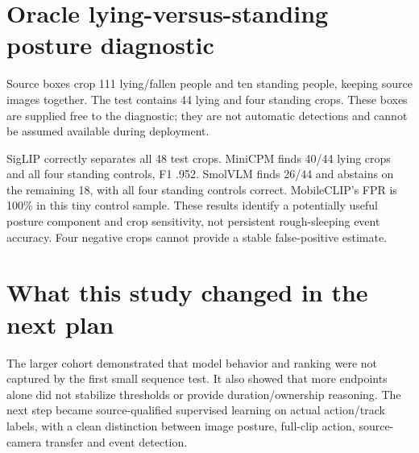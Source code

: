 \section{Oracle lying-versus-standing posture diagnostic}
Source boxes crop 111 lying/fallen people and ten standing people, keeping source images together. The test contains 44 lying and four standing crops. These boxes are supplied free to the diagnostic; they are not automatic detections and cannot be assumed available during deployment.

SigLIP correctly separates all 48 test crops. MiniCPM finds 40/44 lying crops and all four standing controls, F1 .952. SmolVLM finds 26/44 and abstains on the remaining 18, with all four standing controls correct. MobileCLIP's FPR is 100\% in this tiny control sample. These results identify a potentially useful posture component and crop sensitivity, not persistent rough-sleeping event accuracy. Four negative crops cannot provide a stable false-positive estimate.

\section{What this study changed in the next plan}
The larger cohort demonstrated that model behavior and ranking were not captured by the first small sequence test. It also showed that more endpoints alone did not stabilize thresholds or provide duration/ownership reasoning. The next step became source-qualified supervised learning on actual action/track labels, with a clean distinction between image posture, full-clip action, source-camera transfer and event detection.
